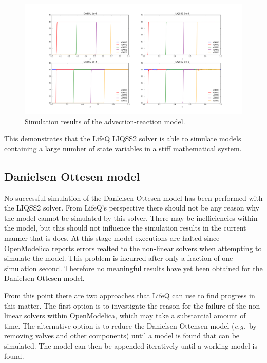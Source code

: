 \documentclass[10pt]{article}
\begin{document}
    \begin{figure}[htbp]\centering
   \includegraphics[scale=0.32, clip,trim={50mm 1mm 45mm 10mm}]{./Fig/advection.png}
\vspace{-0.8cm}
\caption{Simulation results of the advection-reaction model.}\label{Fig5}
\end{figure}

This demonstrates that the LifeQ LIQSS2 solver is able to simulate models containing a large number of state variables in a stiff mathematical system.

\newpage

\subsection{Danielsen Ottesen model}

No successful simulation of the Danielsen Ottesen model has been performed with the LIQSS2 solver. From LifeQ's perspective there should not be any reason why the model cannot be simulated by this solver. There may be inefficiencies within the model, but this should not influence the simulation results in the current manner that is does. At this stage model executions are halted since OpenModelica reports errors realted to the non-linear solvers when attempting to simulate the model. This problem is incurred after only a fraction of one simulation second. Therefore no meaningful results have yet been obtained for the Danielsen Ottesen model.

From this point there are two approaches that LifeQ can use to find progress in this matter. The first option is to investigate the reason for the failure of the non-linear solvers within OpenModelica, which may take a substantial amount of time. The alternative option is to reduce the Danielsen Ottensen model ({\em e.g.}\ by removing valves and other components) until a model is found that can be simulated. The model can then be appended iteratively until a working model is found.
\end{document}

